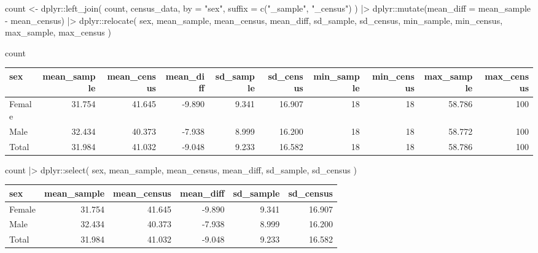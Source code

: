 \documentclass[
  12pt,
  a4paper,
  oneside]{tesesusp}
\newenvironment{Shaded}{\begin{snugshade}}{\end{snugshade}}
\newcommand{\AttributeTok}[1]{\textcolor[rgb]{0.40,0.45,0.13}{#1}}
\newcommand{\FunctionTok}[1]{\textcolor[rgb]{0.28,0.35,0.67}{#1}}
\newcommand{\NormalTok}[1]{\textcolor[rgb]{0.00,0.23,0.31}{#1}}
\newcommand{\OtherTok}[1]{\textcolor[rgb]{0.00,0.23,0.31}{#1}}
\newcommand{\SpecialCharTok}[1]{\textcolor[rgb]{0.37,0.37,0.37}{#1}}
\newcommand{\StringTok}[1]{\textcolor[rgb]{0.13,0.47,0.30}{#1}}
\begin{document}
\begin{Shaded}
\begin{Highlighting}[numbers=left,,]
\NormalTok{count }\OtherTok{\textless{}{-}} 
\NormalTok{  dplyr}\SpecialCharTok{::}\FunctionTok{left\_join}\NormalTok{(}
\NormalTok{    count, }
\NormalTok{    census\_data, }
    \AttributeTok{by =} \StringTok{"sex"}\NormalTok{, }
    \AttributeTok{suffix =} \FunctionTok{c}\NormalTok{(}\StringTok{"\_sample"}\NormalTok{, }\StringTok{"\_census"}\NormalTok{)}
\NormalTok{  ) }\SpecialCharTok{|\textgreater{}}
\NormalTok{  dplyr}\SpecialCharTok{::}\FunctionTok{mutate}\NormalTok{(}\AttributeTok{mean\_diff =}\NormalTok{ mean\_sample }\SpecialCharTok{{-}}\NormalTok{ mean\_census) }\SpecialCharTok{|\textgreater{}}
\NormalTok{  dplyr}\SpecialCharTok{::}\FunctionTok{relocate}\NormalTok{(}
\NormalTok{    sex, mean\_sample, mean\_census, mean\_diff, sd\_sample, sd\_census, }
\NormalTok{    min\_sample, min\_census, max\_sample, max\_census}
\NormalTok{  )}

\NormalTok{count}
\end{Highlighting}
\end{Shaded}

\begin{table}
\centering
\begin{tabular}{l|r|r|r|r|r|r|r|r|r}
\hline
sex & mean\_sample & mean\_census & mean\_diff & sd\_sample & sd\_census & min\_sample & min\_census & max\_sample & max\_census\\
\hline
Female & 31.754 & 41.645 & -9.890 & 9.341 & 16.907 & 18 & 18 & 58.786 & 100\\
\hline
Male & 32.434 & 40.373 & -7.938 & 8.999 & 16.200 & 18 & 18 & 58.772 & 100\\
\hline
Total & 31.984 & 41.032 & -9.048 & 9.233 & 16.582 & 18 & 18 & 58.786 & 100\\
\hline
\end{tabular}
\end{table}

\begin{Shaded}
\begin{Highlighting}[numbers=left,,]

\NormalTok{count }\SpecialCharTok{|\textgreater{}} 
\NormalTok{  dplyr}\SpecialCharTok{::}\FunctionTok{select}\NormalTok{(}
\NormalTok{    sex, mean\_sample, mean\_census, mean\_diff, sd\_sample, sd\_census}
\NormalTok{    )}
\end{Highlighting}
\end{Shaded}

\begin{table}
\centering
\begin{tabular}{l|r|r|r|r|r}
\hline
sex & mean\_sample & mean\_census & mean\_diff & sd\_sample & sd\_census\\
\hline
Female & 31.754 & 41.645 & -9.890 & 9.341 & 16.907\\
\hline
Male & 32.434 & 40.373 & -7.938 & 8.999 & 16.200\\
\hline
Total & 31.984 & 41.032 & -9.048 & 9.233 & 16.582\\
\hline
\end{tabular}
\end{table}
\end{document}
